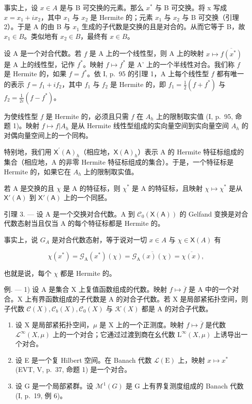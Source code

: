 事实上，设 \(x \in A\) 是与 B 可交换的元素。那么 \(x^{*}\) 与 B 可交换。将 x 写成 \(x = x_{1} + ix_{2}\)，其中 \(x_{1}\) 与 \(x_{2}\) 是 Hermite 的；元素 \(x_{1}\) 与 \(x_{2}\) 与 B 可交换（引理 2）。于是 A 的由 B 与 \(x_{1}\) 生成的子代数是交换的且是对合的。从而它等于 B，故 \(x_{1} \in B\)。类似地有 \(x_{2} \in B\)，最终有 \(x \in B\)。

设 A 是一个对合代数。若 \(f\) 是 A 上的一个线性型，则 A 上的映射 \(x \mapsto \overline{f(x^*)}\) 是 A 上的线性型，记作 \(f^*\)。映射 \(f \mapsto f^*\) 是 A' 上的一个半线性对合。我们称 \(f\) 是 Hermite 的，如果 \(f = f^*\)。依 I, p.~95 的引理 1，A 上每个线性型 \(f\) 都有唯一的表示 \(f = f_1 + if_2\)，其中 \(f_1\) 与 \(f_2\) 是 Hermite 的，即 \(f_1 = \frac{1}{2}(f + f^*)\) 与 \(f_2 = \frac{1}{2i}(f - f^*)\)。

为使线性型 \(f\) 是 Hermite 的，必须且只需 \(f\) 在 \(A_h\) 上的限制取实值 (I, p.~95, 命题 1)。映射 \(f \mapsto f|A_h\) 是从 Hermite 线性型组成的实向量空间到实向量空间 \(A_h\) 的对偶向量空间上的一个同构。

特别地，我们用 \(\mathsf{X}^{\prime}(\mathsf{A})_{h}\)（相应地，\(\mathsf{X}(\mathsf{A})_{h}\)）表示 A 的 Hermite 特征标组成的集合（相应地，A 的非零 Hermite 特征标组成的集合）。于是，一个特征标是 Hermite 的，如果它在 \(A_{h}\) 上的限制取实值。

若 A 是交换的且 \(\chi\) 是 A 的特征标，则 \(\chi^{*}\) 是 A 的特征标，且映射 \(\chi \mapsto \chi^{*}\) 是从 \(\mathsf{X}'(\mathsf{A})\) 到 \(\mathsf{X}'(\mathsf{A})\) 上的一个同胚。

引理 3. --- 设 A 是一个交换对合代数。A 到 \(\mathcal{C}_{0}(\mathsf{X}(\mathsf{A}))\) 的 Gelfand 变换是对合代数态射当且仅当 A 的每个特征标都是 Hermite 的。

事实上，说 \(G_{A}\) 是对合代数态射，等于说对一切 \(x \in A\) 与 \(\chi \in \mathsf{X}(A)\) 有

\[
\chi (x ^ {*}) = \mathcal {G} _ {\mathrm{A}} (x ^ {*}) (\chi) = \overline {{\mathcal {G} _ {\mathrm{A}} (x) (\chi)}} = \overline {{\chi (x)}},
\]

也就是说，每个 \(\chi\) 都是 Hermite 的。

例. --- 1) 设 A 是集合 X 上复值函数组成的代数。映射 \(f \mapsto \overline{f}\) 是 A 中的一个对合。X 上有界函数组成的子代数是 A 的对合子代数。若 X 是局部紧拓扑空间，则子代数 \(\mathcal{C}(X), \mathcal{C}_b(X), \mathcal{C}_0(X)\) 与 \(\mathcal{K}(X)\) 都是 A 的对合子代数。

\begin{enumerate}
\def\labelenumi{\arabic{enumi})}
\setcounter{enumi}{1}
\item
  设 X 是局部紧拓扑空间，\(\mu\) 是 X 上的一个正测度。映射 \(f \mapsto \overline{f}\) 是代数 \(\mathcal{L}^{\infty}(X, \mu)\) 上的一个对合；它通过过渡到商在幺代数 \(\mathrm{L}^{\infty}(X, \mu)\) 上诱导出一个对合。
\item
  设 E 是一个复 Hilbert 空间。在 Banach 代数 \(\mathcal{L}(\mathrm{E})\) 上，映射 \(x \mapsto x^{*}\) (EVT, V, p.~37, 命题 1) 是一个对合。
\item
  设 G 是一个局部紧群。设 \(\mathcal{M}^{1}(G)\) 是 G 上有界复测度组成的 Banach 代数 (I, p.~19, 例 6)。
\end{enumerate}

